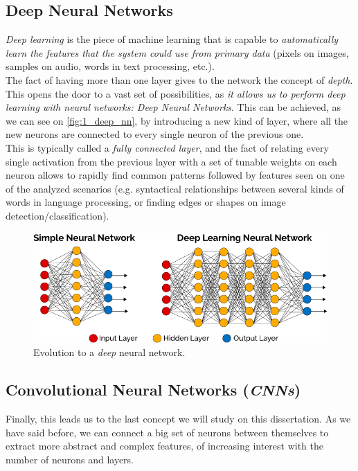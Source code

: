 \subsection{Deep Neural Networks}

\emph{Deep learning} is the piece of machine learning that is capable to \textit{automatically learn the features that the system could use from primary data} (pixels on images, samples on audio, words in text processing, etc.).\\

The fact of having more than one layer gives to the network the concept of \emph{depth}. This opens the door to a vast set of possibilities, as \textit{it allows us to perform deep learning with neural networks: Deep Neural Networks}. This can be achieved, as we can see on \autoref{fig:1_deep_nn}, by introducing a new kind of layer, where all the new neurons are connected to every single neuron of the previous one.\\
This is typically called a \textit{fully connected layer}, and the fact of relating every single activation from the previous layer with a set of tunable weights on each neuron allows to rapidly find common patterns followed by features seen on one of the analyzed scenarios (e.g. syntactical relationships between several kinds of words in language processing, or finding edges or shapes on image detection/classification).

\begin{figure}[h]
	\centering
	\includegraphics[width=0.9\linewidth]{images/deep_neural_network}
	\caption{Evolution to a \textit{deep} neural network.}
	\label{fig:1_deep_nn}
\end{figure}

\subsection{Convolutional Neural Networks (\emph{CNNs})}
\label{sec:1_cnn}

Finally, this leads us to the last concept we will study on this dissertation. As we have said before, we can connect a big set of neurons between themselves to extract more abstract and complex features, of increasing interest with the number of neurons and layers.\\
 
